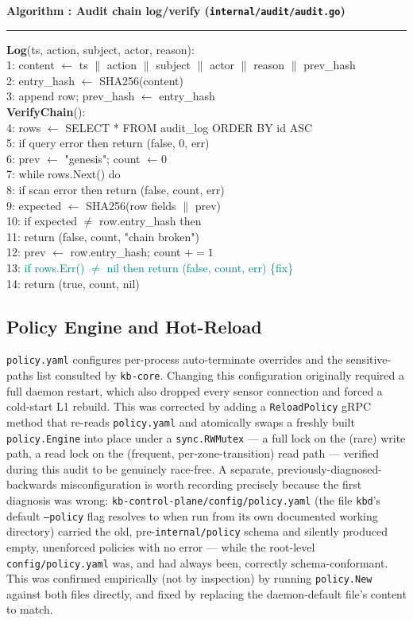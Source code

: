 \documentclass{article}
\newcounter{algo}
\newenvironment{algobox}[1]{%
  \begin{framed}\refstepcounter{algo}\textbf{\sffamily\small Algorithm \thealgo: #1}\vspace{3pt}\hrule\vspace{5pt}
  \small\ttfamily\raggedright
}{%
  \end{framed}
}
\begin{document}
\begin{algobox}{Audit chain log/verify (\texttt{internal/audit/audit.go})}
\label{alg:auditchain}
\textbf{Log}(ts, action, subject, actor, reason):\\
1: content $\gets$ ts $\|$ action $\|$ subject $\|$ actor $\|$ reason $\|$ prev\_hash\\
2: entry\_hash $\gets$ SHA256(content)\\
3: append row; prev\_hash $\gets$ entry\_hash\\[4pt]
\textbf{VerifyChain}():\\
4: rows $\gets$ SELECT * FROM audit\_log ORDER BY id ASC\\
5: if query error then return (false, 0, err)\\
6: prev $\gets$ "genesis"; count $\gets 0$\\
7: while rows.Next() do\\
8: \quad if scan error then return (false, count, err)\\
9: \quad expected $\gets$ SHA256(row fields $\|$ prev)\\
10: \quad if expected $\neq$ row.entry\_hash then\\
11: \qquad return (false, count, "chain broken")\\
12: \quad prev $\gets$ row.entry\_hash; count $\mathrel{+}= 1$\\
13: \textcolor{teal}{if rows.Err() $\neq$ nil then return (false, count, err)} \quad\textcolor{teal}{\{fix\}}\\
14: return (true, count, nil)
\end{algobox}

\subsection{Policy Engine and Hot-Reload}
\label{sec:policy-reload}

\texttt{policy.yaml} configures per-process auto-terminate overrides
and the sensitive-paths list consulted by \texttt{kb-core}. Changing
this configuration originally required a full daemon restart, which
also dropped every sensor connection and forced a cold-start L1
rebuild. This was corrected by adding a \texttt{ReloadPolicy} gRPC
method that re-reads \texttt{policy.yaml} and atomically swaps a freshly
built \texttt{policy.Engine} into place under a \texttt{sync.RWMutex}
--- a full lock on the (rare) write path, a read lock on the (frequent,
per-zone-transition) read path --- verified during this audit to be
genuinely race-free. A separate, previously-diagnosed-backwards
misconfiguration is worth recording precisely because the first
diagnosis was wrong: \texttt{kb-control-plane/config/policy.yaml} (the
file \texttt{kbd}'s default \texttt{--policy} flag resolves to when run
from its own documented working directory) carried the old,
pre-\texttt{internal/policy} schema and silently produced empty,
unenforced policies with no error --- while the root-level
\texttt{config/policy.yaml} was, and had always been, correctly
schema-conformant. This was confirmed empirically (not by inspection)
by running \texttt{policy.New} against both files directly, and fixed
by replacing the daemon-default file's content to match.
\end{document}
